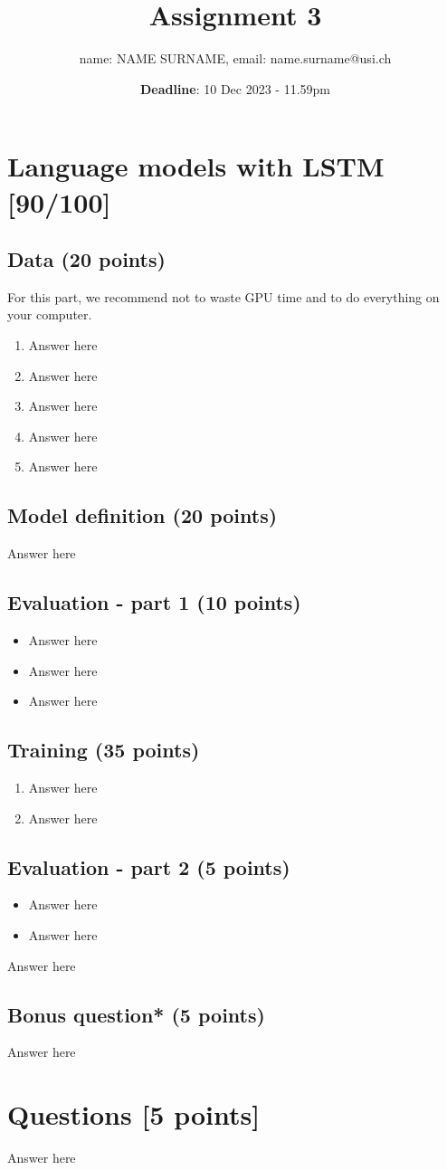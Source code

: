 \documentclass[a4paper]{article}
\title{Assignment 3}
\date{\textbf{Deadline}: 10 Dec 2023 - 11.59pm}
\author{name: NAME SURNAME, email: name.surname@usi.ch}
\begin{document}
\maketitle

\section{Language models with LSTM [90/100]}

\subsection{Data (20 points)}
For this part, we recommend not to waste GPU time and to do everything on your computer. 
\begin{enumerate}
    \item Answer here
    \item Answer here
    \item Answer here
    \item Answer here
    \item Answer here
\end{enumerate}

\subsection{Model definition (20 points)}
Answer here

\subsection{Evaluation - part 1 (10 points)}
\begin{itemize}
    \item Answer here
    \item Answer here
    \item Answer here
\end{itemize}

\subsection{Training (35 points)}
\begin{enumerate}
    \item Answer here
    \item Answer here
\end{enumerate}

\subsection{Evaluation - part 2 (5 points)}
\begin{itemize}
    \item Answer here
    \item Answer here
\end{itemize}
Answer here

\subsection{Bonus question* (5 points)}
Answer here

\section{Questions [5 points]}
Answer here
\end{document}
